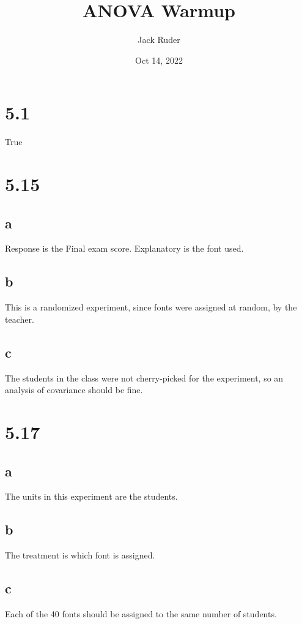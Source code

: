\documentclass[a4paper]{article}
\title{ANOVA Warmup}
\date{Oct 14, 2022}
\author{Jack Ruder}
\begin{document}
\doublespacing
\maketitle

\section*{5.1}
True
\section*{5.15}%
\label{sec:5.15}
\subsection*{a}%
\label{sub:a}
Response is the Final exam score. Explanatory is the font used.
\subsection*{b}%
\label{sub:b}
This is a randomized experiment, since fonts were assigned at random, by the teacher.
\subsection*{c}%
\label{sub:c}
The students in the class were not cherry-picked for the experiment, so an analysis of covariance should be fine.

\section*{5.17}%
\label{sec:5.17}
\subsection*{a}
The units in this experiment are the students.
\subsection*{b}%
\label{sub:b}
The treatment is which font is assigned.
\subsection*{c}%
Each of the 40 fonts should be assigned to the same number of students.
\label{sub:c}
\end{document}
